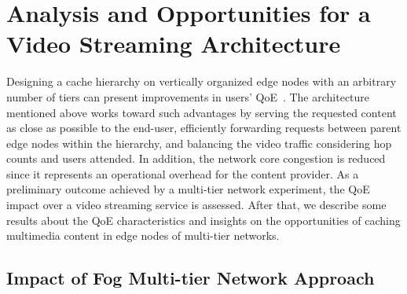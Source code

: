 \section{Analysis and Opportunities for a Video Streaming Architecture}
\label{sec:system-archi}


Designing a cache hierarchy on vertically organized edge nodes with an arbitrary number of tiers can present improvements in users’ QoE~\cite{rana2018vertical}. The architecture mentioned above works toward such advantages by serving the requested content as close as possible to the end-user, efficiently forwarding requests between parent edge nodes within the hierarchy, and balancing the video traffic considering hop counts and users attended. In addition, the network core congestion is reduced since it represents an operational overhead for the content provider.
As a preliminary outcome achieved by a multi-tier network experiment, the QoE impact over a video streaming service is assessed. After that, we describe some results about the QoE characteristics and insights on the opportunities of caching multimedia content in edge nodes of multi-tier networks.

\subsection{Impact of Fog Multi-tier Network Approach}

